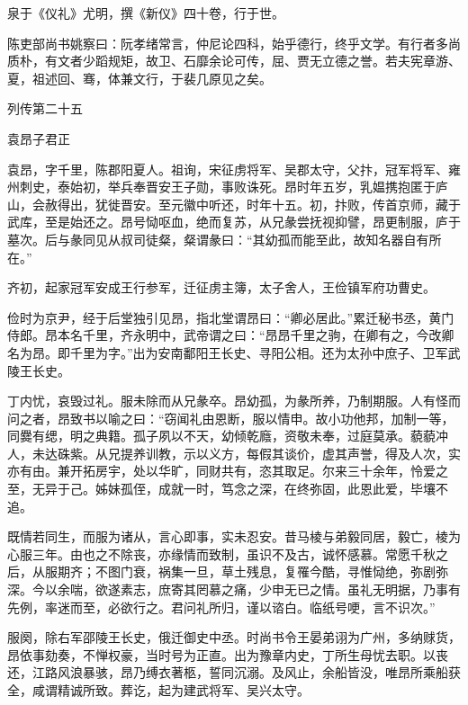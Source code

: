 \documentclass[12pt,UTF8]{ctexbook}
\begin{document}
泉于《仪礼》尤明，撰《新仪》四十卷，行于世。

陈吏部尚书姚察曰：阮孝绪常言，仲尼论四科，始乎德行，终乎文学。有行者多尚质朴，有文者少蹈规矩，故卫、石靡余论可传，屈、贾无立德之誉。若夫宪章游、夏，祖述回、骞，体兼文行，于裴几原见之矣。





列传第二十五

袁昂子君正

袁昂，字千里，陈郡阳夏人。祖询，宋征虏将军、吴郡太守，父抃，冠军将军、雍州刺史，泰始初，举兵奉晋安王子勋，事败诛死。昂时年五岁，乳媪携抱匿于庐山，会赦得出，犹徙晋安。至元徽中听还，时年十五。初，抃败，传首京师，藏于武库，至是始还之。昂号恸呕血，绝而复苏，从兄彖尝抚视抑譬，昂更制服，庐于墓次。后与彖同见从叔司徒粲，粲谓彖曰：“其幼孤而能至此，故知名器自有所在。”

齐初，起家冠军安成王行参军，迁征虏主簿，太子舍人，王俭镇军府功曹史。

俭时为京尹，经于后堂独引见昂，指北堂谓昂曰：“卿必居此。”累迁秘书丞，黄门侍郎。昂本名千里，齐永明中，武帝谓之曰：“昂昂千里之驹，在卿有之，今改卿名为昂。即千里为字。”出为安南鄱阳王长史、寻阳公相。还为太孙中庶子、卫军武陵王长史。

丁内忧，哀毁过礼。服未除而从兄彖卒。昂幼孤，为彖所养，乃制期服。人有怪而问之者，昂致书以喻之曰：“窃闻礼由恩断，服以情申。故小功他邦，加制一等，同爨有缌，明之典籍。孤子夙以不天，幼倾乾廕，资敬未奉，过庭莫承。藐藐冲人，未达硃紫。从兄提养训教，示以义方，每假其谈价，虚其声誉，得及人次，实亦有由。兼开拓房宇，处以华旷，同财共有，恣其取足。尔来三十余年，怜爱之至，无异于己。姊妹孤侄，成就一时，笃念之深，在终弥固，此恩此爱，毕壤不追。

既情若同生，而服为诸从，言心即事，实未忍安。昔马棱与弟毅同居，毅亡，棱为心服三年。由也之不除丧，亦缘情而致制，虽识不及古，诚怀感慕。常愿千秋之后，从服期齐；不图门衰，祸集一旦，草土残息，复罹今酷，寻惟恸绝，弥剧弥深。今以余喘，欲遂素志，庶寄其罔慕之痛，少申无已之情。虽礼无明据，乃事有先例，率迷而至，必欲行之。君问礼所归，谨以谘白。临纸号哽，言不识次。”

服阕，除右军邵陵王长史，俄迁御史中丞。时尚书令王晏弟诩为广州，多纳赇货，昂依事劾奏，不惮权豪，当时号为正直。出为豫章内史，丁所生母忧去职。以丧还，江路风浪暴骇，昂乃缚衣著柩，誓同沉溺。及风止，余船皆没，唯昂所乘船获全，咸谓精诚所致。葬讫，起为建武将军、吴兴太守。
\end{document}
